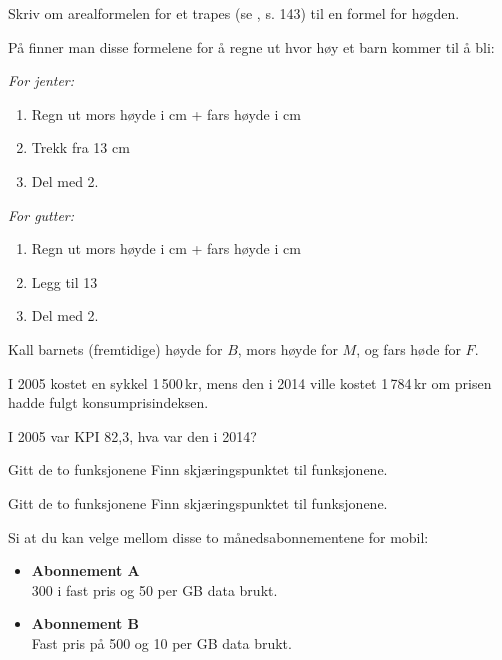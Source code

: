 Skriv om arealformelen for et trapes (se \mb, s. 143) til en formel for høgden.

På
 finner man disse formelene for å regne ut hvor høy et barn kommer til å bli:\os

\textit{For jenter:}
\begin{enumerate}
	\item Regn ut mors høyde i cm + fars høyde i cm
	\item Trekk fra 13 cm
	\item Del med 2.
\end{enumerate}

\textit{For gutter:}
\begin{enumerate}
	\item Regn ut mors høyde i cm + fars høyde i cm
	\item Legg til 13 
	\item Del med 2.
\end{enumerate}
Kall barnets (fremtidige) høyde for $ B $, mors høyde for $ M $, og fars høde for $ F $.

I 2005 kostet en sykkel 1\,500\,kr, mens den i 2014 ville kostet 1\,784\,kr om prisen hadde fulgt konsumprisindeksen. \os

I 2005 var KPI 82,3, hva var den i 2014?

\nes
{}
Gitt de to funksjonene
Finn skjæringspunktet til funksjonene.

Gitt de to funksjonene
Finn skjæringspunktet til funksjonene.

Si at du kan velge mellom disse to månedsabonnementene for mobil:
\begin{itemize}
	\item \textbf{Abonnement A} \\
	300 i fast pris og 50 per GB data brukt.
	\item \textbf{Abonnement B} \\
	Fast pris på 500 og 10 per GB data brukt.
\end{itemize}

